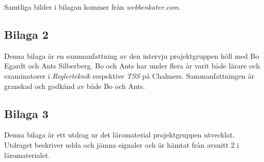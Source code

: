 \documentclass[12pt,a4paper,twoside,openright]{article}
\begin{document}
Samtliga bilder i bilagan kommer från
\textit{webbenkater.com}.
\newpage

\subsection{Bilaga 2}
\label{bil:exam_intervju}
Denna bilaga är en sammanfattning av den intervju projektgruppen höll
med Bo Egardt och Ants Silberberg. Bo och Ants har under flera år
varit både lärare och examinatorer i \textit{Reglerteknik} respektive
\textit{TSS} på Chalmers. Sammanfattningen är granskad och godkänd av
både Bo och Ants.
\newpage

\subsection{Bilaga 3}
\label{bil:3}
Denna bilaga är ett utdrag ur det läromaterial projektgruppen
utvecklat. Utdraget beskriver udda och jämna signaler och är hämtat
från avsnitt 2 i läromaterialet.
\end{document}
